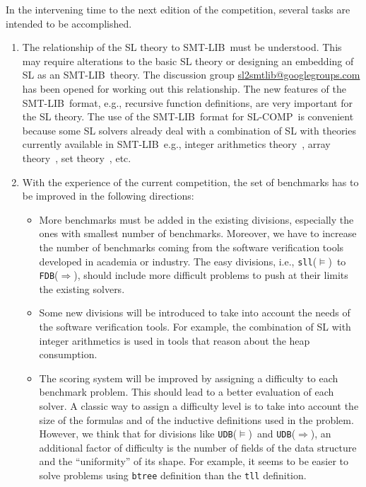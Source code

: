 \documentclass[twoside,11pt]{article}
\newcommand{\limp}{\Rightarrow}
\newcommand{\sllsat}{\texttt{sll}($\models$)}
\newcommand{\FDBent}{\texttt{FDB}($\limp$)}
\newcommand{\UDBsat}{\texttt{UDB}($\models$)}
\newcommand{\UDBent}{\texttt{UDB}($\limp$)}
\newcommand{\smtlib}{\textsf{SMT-LIB}}
\newcommand{\slcomp}{\textsf{SL-COMP}}
\begin{document}
In the intervening time to the next edition of the competition, several tasks are intended to be accomplished.
\begin{enumerate}

\item The relationship of the SL theory to \smtlib\ must be understood. 
This may require alterations to the basic SL theory or designing an embedding of SL as an \smtlib\ theory.
The discussion group \url{sl2smtlib@googlegroups.com} has been opened for working out this relationship.
The new features of the \smtlib\ format, e.g., recursive function definitions, are very important for the SL theory.
The use of the \smtlib\ format for \slcomp\ is convenient because some SL solvers already deal with a combination of SL with theories currently available in \smtlib\, e.g., 
integer arithmetics theory~\cite{PerezR11}, array theory~\cite{BouajjaniDES12-vmcai}, set theory~\cite{PiskacWZ13}, etc.


\item With the experience of the current competition, the set of benchmarks has to be improved in the following directions:
\begin{itemize}
\item More benchmarks must be added in the existing divisions, especially the ones with smallest number of benchmarks. 
Moreover, we have to increase the number of benchmarks coming from the software verification tools developed in academia or industry.
The easy divisions, i.e., \sllsat\ to \FDBent, should include more difficult problems to push at their limits the existing solvers.

\item Some new divisions will be introduced to take into account the needs of the software verification tools. For example, the combination of SL with integer arithmetics is used in tools that reason about the heap consumption.

\item The scoring system will be improved by assigning a difficulty to each benchmark problem. This should lead to a better evaluation of each solver.
A classic way to assign a difficulty level is to take into account the size of the formulas and of the inductive definitions used in the problem. 
However, we think that for divisions like \UDBsat\ and \UDBent, an additional factor of difficulty is the number of fields of the data structure and the ``uniformity'' of its shape. 
For example, it seems to be easier to solve problems using \texttt{btree} definition than the \texttt{tll} definition.
\end{itemize}


\end{enumerate}
\end{document}
